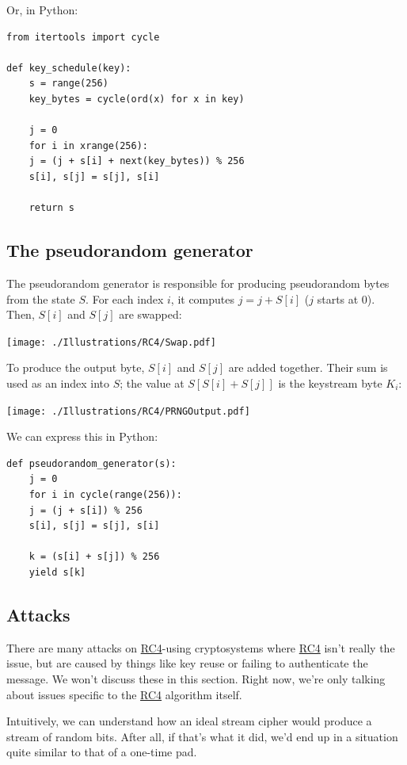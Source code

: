 \documentclass[11pt,ebook,table,dvipsnames]{memoir}
\begin{document}
Or, in Python:

\begin{verbatim}
from itertools import cycle

def key_schedule(key):
    s = range(256)
    key_bytes = cycle(ord(x) for x in key)

    j = 0
    for i in xrange(256):
	j = (j + s[i] + next(key_bytes)) % 256
	s[i], s[j] = s[j], s[i]

    return s
\end{verbatim}
\subsection{The pseudorandom generator}
\label{sec-2-3-9-2}

The pseudorandom generator is responsible for producing pseudorandom
bytes from the state $S$. For each index $i$, it computes $j = j +
S[i]$ ($j$ starts at 0). Then, $S[i]$ and $S[j]$ are swapped:

\texttt{[image: ./Illustrations/RC4/Swap.pdf]}

To produce the output byte, $S[i]$ and $S[j]$ are added together.
Their sum is used as an index into $S$; the value at $S[S[i] + S[j]]$
is the keystream byte $K_i$:

\texttt{[image: ./Illustrations/RC4/PRNGOutput.pdf]}

We can express this in Python:

\begin{verbatim}
def pseudorandom_generator(s):
    j = 0
    for i in cycle(range(256)):
	j = (j + s[i]) % 256
	s[i], s[j] = s[j], s[i]

	k = (s[i] + s[j]) % 256
	yield s[k]
\end{verbatim}
\subsection{Attacks}
\label{sec-2-3-9-3}

There are many attacks on \hyperref[RC4]{RC4}-using cryptosystems where \hyperref[RC4]{RC4} isn't
really the issue, but are caused by things like key reuse or failing
to authenticate the message. We won't discuss these in this section.
Right now, we're only talking about issues specific to the \hyperref[RC4]{RC4}
algorithm itself.

Intuitively, we can understand how an ideal stream cipher would
produce a stream of random bits. After all, if that's what it did,
we'd end up in a situation quite similar to that of a one-time pad.
\end{document}
